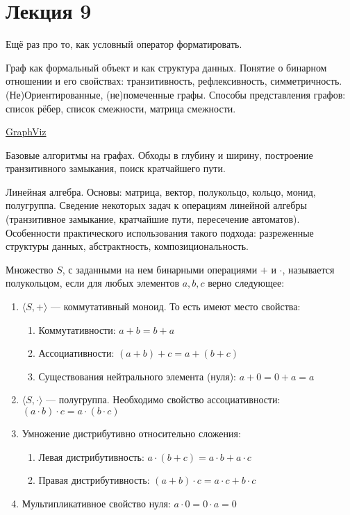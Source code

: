 \section{Лекция 9}

Ещё раз про то, как условный оператор форматировать.
 

Граф как формальный объект и как структура данных. Понятие о бинарном отношении и его свойствах: транзитивность, рефлексивность, симметричность. (Не)Ориентированные, (не)помеченные графы. Способы представления графов: список рёбер, список смежности, матрица смежности.

\href{https://graphviz.org/}{GraphViz}

Базовые алгоритмы на графах. Обходы в глубину и ширину, построение транзитивного замыкания, поиск кратчайшего пути.

Линейная алгебра. Основы: матрица, вектор, полукольцо, кольцо, монид, полугруппа. Сведение некоторых задач к операциям линейной алгебры (транзитивное замыкание, кратчайшие пути, пересечение автоматов). Особенности практического использования такого подхода: разреженные структуры данных, абстрактность, композициональность.

Множество $S$, с заданными на нем бинарными операциями $+$ и $\cdot$, называется полукольцом, если для любых элементов $a,b,c$ верно следующее:
\begin{enumerate}
\item $\langle S,+\rangle$ --- коммутативный моноид. То есть имеют место свойства:
\begin{enumerate}
	\item Коммутативности: $a+b=b+a$
    \item Ассоциативности: $(a+b)+c=a+(b+c)$
   	\item Существования нейтрального элемента (нуля): $a+0=0+a=a$
\end{enumerate}
\item $\langle S,\cdot \rangle$ --- полугруппа. Необходимо свойство ассоциативности: $(a\cdot b)\cdot c=a\cdot (b\cdot c)$
\item Умножение дистрибутивно относительно сложения:
\begin{enumerate}
	\item Левая дистрибутивность: $a\cdot (b+c)=a\cdot b+a\cdot c$
    \item Правая дистрибутивность: $(a+b)\cdot c=a\cdot c+b\cdot c$
\end{enumerate}
\item Мультипликативное свойство нуля: $a\cdot 0=0\cdot a=0$
\end{enumerate}

